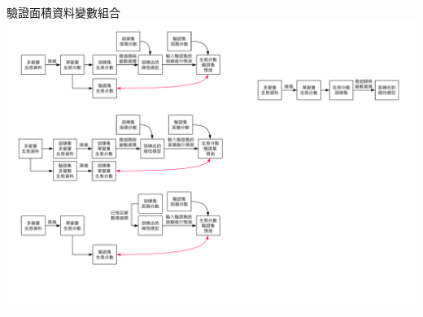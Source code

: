 \documentclass[10pt, aspectratio=1610, xcolor=table]{beamer}
\begin{document}
\begin{frame}{驗證面積資料變數組合}
\centering\includegraphics[width=1\textwidth]{diagram-驗證面積資料變數組合.pdf}

\end{frame}
\end{document}
